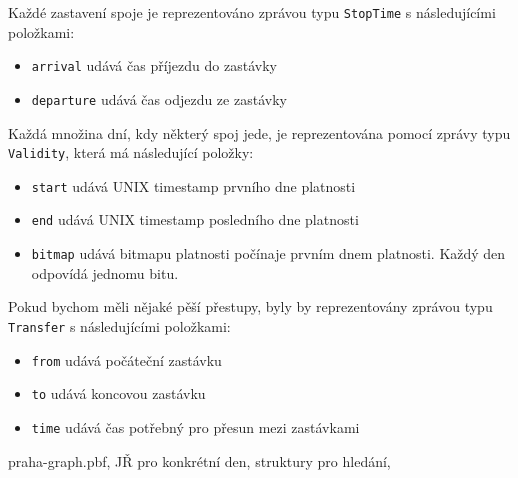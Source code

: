 Každé zastavení spoje je reprezentováno zprávou typu {\tt StopTime} s
následujícími položkami:
\begin{itemize}
	\item {\tt arrival} udává čas příjezdu do zastávky
	\item {\tt departure} udává čas odjezdu ze zastávky
\end{itemize}
Každá množina dní, kdy některý spoj jede, je reprezentována pomocí zprávy typu
{\tt Validity}, která má následující položky:
\begin{itemize}
	\item {\tt start} udává UNIX timestamp prvního dne platnosti 
	\item {\tt end} udává UNIX timestamp posledního dne platnosti
	\item {\tt bitmap} udává bitmapu platnosti počínaje prvním dnem
	platnosti. Každý den odpovídá jednomu bitu.
\end{itemize}
Pokud bychom měli nějaké pěší přestupy, byly by reprezentovány zprávou typu {\tt
Transfer} s následujícími položkami:
\begin{itemize}
	\item {\tt from} udává počáteční zastávku
	\item {\tt to} udává koncovou zastávku
	\item {\tt time} udává čas potřebný pro přesun mezi zastávkami
\end{itemize}
\TODO praha-graph.pbf, JŘ pro konkrétní den, struktury pro hledání,

